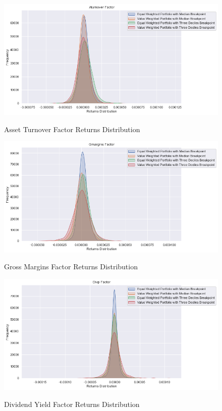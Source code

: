 \begin{figure}[H]
	\caption{Asset Turnover Factor Returns Distribution}
	\centering
	\includegraphics[scale=.63]{../../output/figures/aturnover.png}
	\label{fig:aturnover}
\end{figure}

\begin{figure}[H]
	\caption{Gross Margins Factor Returns Distribution}
	\centering
	\includegraphics[scale=.63]{../../output/figures/gmargins.png}
	\label{fig:gmargins}
\end{figure}

\begin{figure}[H]
	\caption{Dividend Yield Factor Returns Distribution}
	\centering
	\includegraphics[scale=.63]{../../output/figures/divp.png}
	\label{fig:divp}
\end{figure}

